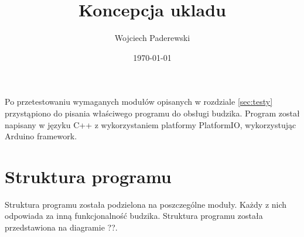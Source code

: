 \documentclass[../main.tex]{subfiles}
\author{Wojciech Paderewski}
\date{\today}
\title{Koncepcja ukladu}
\begin{document}
Po przetestowaniu wymaganych modułów opisanych w rozdziale \ref{sec:testy} przystąpiono do pisania właściwego programu do obsługi budzika.
Program został napisany w języku C++ z wykorzystaniem platformy PlatformIO, wykorzystując Arduino framework.
\section{Struktura programu}
Struktura programu została podzielona na poszczególne moduły. Każdy z nich odpowiada za inną funkcjonalność budzika.
Struktura programu została przedstawiona na diagramie ??.
\end{document}
